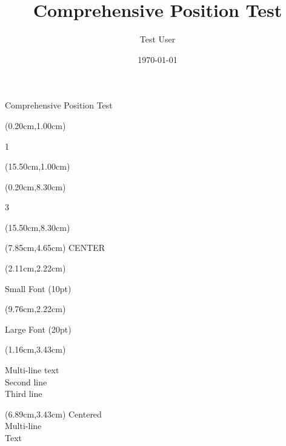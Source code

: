 \documentclass[aspectratio=169,xcolor=dvipsnames,professionalfonts]{beamer}
\title{Comprehensive Position Test}
\author{Test User}
\date{\today}
\begin{document}
\begin{frame}
\titlepage
\end{frame}

\begin{frame}{Comprehensive Position Test}

\begin{textblock*}{1.00cm}(0.20cm,1.00cm)
{\fontsize{12}{14.399999999999999}\selectfont\raggedright 1}
\end{textblock*}

\begin{textblock*}{1.00cm}(15.50cm,1.00cm)
{\fontsize{12}{14.399999999999999}\selectfont{}}
\end{textblock*}

\begin{textblock*}{1.00cm}(0.20cm,8.30cm)
{\fontsize{12}{14.399999999999999}\selectfont\raggedright 3}
\end{textblock*}

\begin{textblock*}{1.00cm}(15.50cm,8.30cm)
{\fontsize{12}{14.399999999999999}\selectfont{}}
\end{textblock*}

\begin{textblock*}{1.72cm}(7.85cm,4.65cm)
{\fontsize{14}{16.8}\selectfont\centering CENTER}
\end{textblock*}

\begin{textblock*}{3.60cm}(2.11cm,2.22cm)
{\fontsize{10}{12}\selectfont\raggedright Small Font (10pt)}
\end{textblock*}

\begin{textblock*}{7.92cm}(9.76cm,2.22cm)
{\fontsize{20}{24}\selectfont\bfseries \raggedright Large Font (20pt)}
\end{textblock*}

\begin{textblock*}{4.78cm}(1.16cm,3.43cm)
{\fontsize{14}{16.8}\selectfont\raggedright Multi-line text\\Second line\\Third line}
\end{textblock*}

\begin{textblock*}{3.82cm}(6.89cm,3.43cm)
{\fontsize{14}{16.8}\selectfont\centering Centered\\Multi-line\\Text}
\end{textblock*}


\end{frame}
\end{document}
